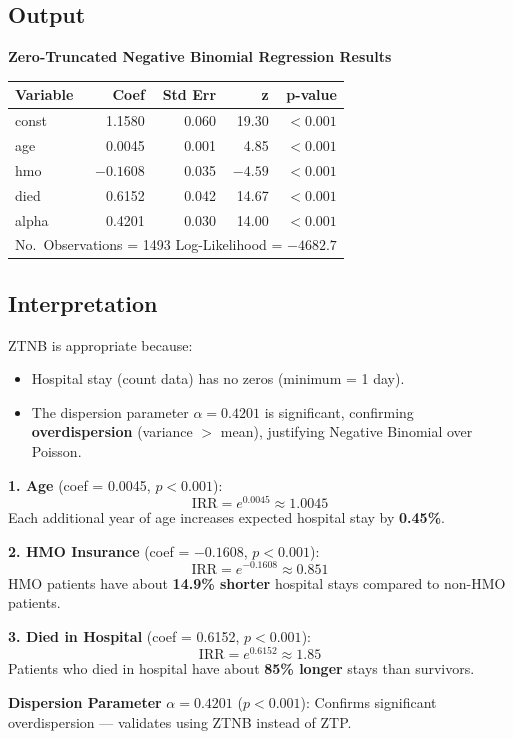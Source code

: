 \documentclass[12pt,a4paper]{article}
\begin{document}
\subsection{Output}

\begin{outputbox}
\textbf{Zero-Truncated Negative Binomial Regression Results}
\begin{center}
\begin{tabular}{lrrrr}
\toprule
Variable & Coef    & Std Err & z     & p-value  \\
\midrule
const    & 1.1580  & 0.060   & 19.30 & $<0.001$ \\
age      & 0.0045  & 0.001   & 4.85  & $<0.001$ \\
hmo      & $-0.1608$ & 0.035 & $-4.59$ & $<0.001$ \\
died     & 0.6152  & 0.042   & 14.67 & $<0.001$ \\
alpha    & 0.4201  & 0.030   & 14.00 & $<0.001$ \\
\bottomrule
\multicolumn{5}{l}{No.\ Observations = 1493 \quad Log-Likelihood = $-4682.7$} \\
\end{tabular}
\end{center}
\end{outputbox}

\subsection{Interpretation}

\begin{interpbox}
ZTNB is appropriate because:
\begin{itemize}[noitemsep]
  \item Hospital stay (count data) has no zeros (minimum = 1 day).
  \item The dispersion parameter $\alpha = 0.4201$ is significant, confirming \textbf{overdispersion} (variance $>$ mean), justifying Negative Binomial over Poisson.
\end{itemize}

\textbf{1. Age} (coef = 0.0045, $p < 0.001$):
\[
  \text{IRR} = e^{0.0045} \approx 1.0045
\]
Each additional year of age increases expected hospital stay by \textbf{0.45\%}.

\textbf{2. HMO Insurance} (coef = $-0.1608$, $p < 0.001$):
\[
  \text{IRR} = e^{-0.1608} \approx 0.851
\]
HMO patients have about \textbf{14.9\% shorter} hospital stays compared to non-HMO patients.

\textbf{3. Died in Hospital} (coef = 0.6152, $p < 0.001$):
\[
  \text{IRR} = e^{0.6152} \approx 1.85
\]
Patients who died in hospital have about \textbf{85\% longer} stays than survivors.

\textbf{Dispersion Parameter} $\alpha = 0.4201$ ($p < 0.001$): Confirms significant overdispersion — validates using ZTNB instead of ZTP.
\end{interpbox}

\end{document}
